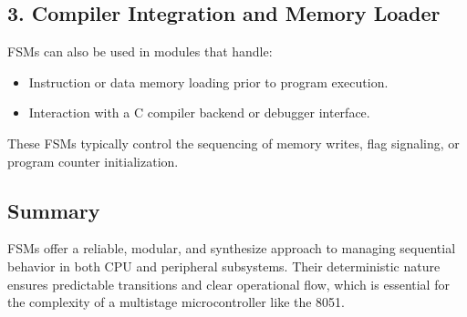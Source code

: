 \subsection*{3. Compiler Integration and Memory Loader}

FSMs can also be used in modules that handle:
\begin{itemize}
    \item Instruction or data memory loading prior to program execution.
    \item Interaction with a C compiler backend or debugger interface.
\end{itemize}

These FSMs typically control the sequencing of memory writes, flag signaling, or program
counter initialization.

\subsection*{Summary}

FSMs offer a reliable, modular, and synthesize approach to managing sequential behavior 
in both CPU and peripheral subsystems. Their deterministic nature ensures predictable 
transitions and clear operational flow, which is essential for the complexity of a 
multistage microcontroller like the 8051.
